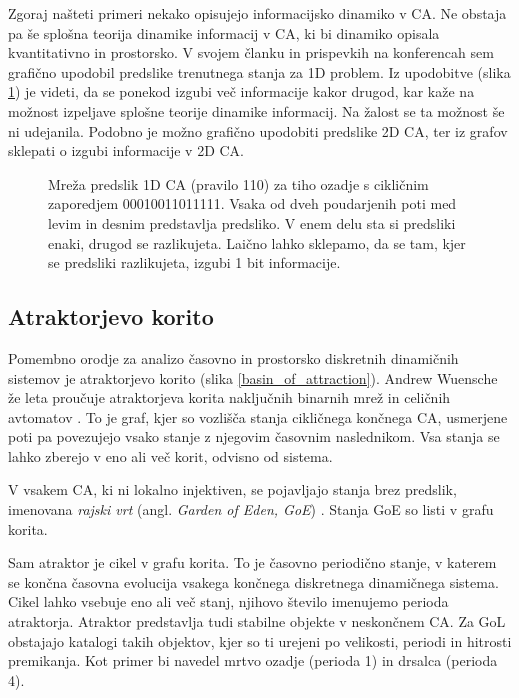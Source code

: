\documentclass[12pt,a4paper,openany,twoside]{book}
\begin{document}
Zgoraj našteti primeri nekako opisujejo informacijsko dinamiko v CA.
Ne obstaja pa še splošna teorija dinamike informacij v CA,
ki bi dinamiko opisala kvantitativno in prostorsko.
V svojem članku \cite{JerasDobnikar2007} in prispevkih na konferencah \cite{DBLP:conf/iccS/JerasD06, DBLP:conf/automata/Jeras08, Jeras2008-pyca}
sem grafično upodobil predslike trenutnega stanja za 1D problem.
Iz upodobitve (slika \ref{network_rule110_quiescent}) je videti, da se ponekod izgubi več informacije kakor drugod,
kar kaže na možnost izpeljave splošne teorije dinamike informacij.
Na žalost se ta možnost še ni udejanila. Podobno je možno grafično upodobiti predslike 2D CA,
ter iz grafov sklepati o izgubi informacije v 2D CA.

\vspace{10mm}
\begin{figure}[htb]
\centerline{}
\caption[Mreža predslik 1D CA.]
{Mreža predslik 1D CA (pravilo 110) za tiho ozadje s cikličnim zaporedjem 00010011011111.
Vsaka od dveh poudarjenih poti med levim in desnim predstavlja predsliko.
V enem delu sta si predsliki enaki, drugod se razlikujeta.
Laično lahko sklepamo, da se tam, kjer se predsliki razlikujeta, izgubi 1 bit informacije.}
\label{network_rule110_quiescent}
\end{figure}
\vspace{5mm}

\subsection{Atraktorjevo korito}

Pomembno orodje za analizo časovno in prostorsko diskretnih dinamičnih sistemov je atraktorjevo korito (slika \ref{basin_of_attraction}).
Andrew Wuensche že leta proučuje atraktorjeva korita naključnih binarnih mrež in celičnih avtomatov \cite{Wuensche1992, WuenscheDDLab}.
To je graf, kjer so vozlišča stanja cikličnega končnega CA,
usmerjene poti pa povezujejo vsako stanje z njegovim časovnim naslednikom.
Vsa stanja se lahko zberejo v eno ali več korit, odvisno od sistema.

V vsakem CA, ki ni lokalno injektiven, se pojavljajo stanja brez predslik,
imenovana \emph{rajski vrt} (angl. \emph{Garden of Eden, GoE}) \cite{Moore1962, Myhill1963}.
Stanja GoE so listi v grafu korita.

Sam atraktor je cikel v grafu korita.
To je časovno periodično stanje, v katerem se končna časovna evolucija vsakega končnega diskretnega dinamičnega sistema.
Cikel lahko vsebuje eno ali več stanj, njihovo število imenujemo perioda atraktorja.
Atraktor predstavlja tudi stabilne objekte v neskončnem CA.
Za GoL obstajajo katalogi takih objektov, kjer so ti urejeni po velikosti, periodi in hitrosti premikanja.
Kot primer bi navedel mrtvo ozadje (perioda 1) in drsalca (perioda 4).
\end{document}
